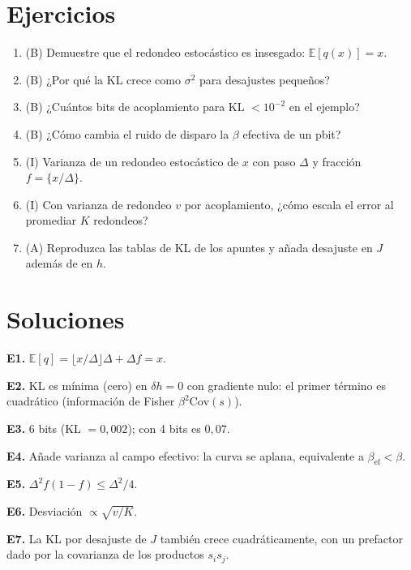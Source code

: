 \documentclass[11pt,a4paper]{article}
\begin{document}
\section{Ejercicios}
\begin{enumerate}[label=\textbf{E\arabic*.}]
\item (B) Demuestre que el redondeo estocástico es insesgado: $\mathbb E[q(x)]=x$.
\item (B) ¿Por qué la KL crece como $\sigma^2$ para desajustes pequeños?
\item (B) ¿Cuántos bits de acoplamiento para KL $<10^{-2}$ en el ejemplo?
\item (B) ¿Cómo cambia el ruido de disparo la $\beta$ efectiva de un pbit?
\item (I) Varianza de un redondeo estocástico de $x$ con paso $\Delta$ y fracción $f=\{x/\Delta\}$.
\item (I) Con varianza de redondeo $v$ por acoplamiento, ¿cómo escala el error al promediar $K$ redondeos?
\item (A) Reproduzca las tablas de KL de los apuntes y añada desajuste en $J$ además de en $h$.
\end{enumerate}
\section{Soluciones}
\begin{solucion}
\textbf{E1.} $\mathbb E[q]=\lfloor x/\Delta\rfloor\Delta+\Delta f=x$.

\textbf{E2.} KL es mínima (cero) en $\delta h=0$ con gradiente nulo: el primer término es cuadrático (información de Fisher $\beta^2\mathrm{Cov}(s)$).

\textbf{E3.} 6 bits (KL $=0{,}002$); con 4 bits es $0{,}07$.

\textbf{E4.} Añade varianza al campo efectivo: la curva se aplana, equivalente a $\beta_{\text{ef}}<\beta$.

\textbf{E5.} $\Delta^2f(1-f)\le\Delta^2/4$.

\textbf{E6.} Desviación $\propto\sqrt{v/K}$.

\textbf{E7.} La KL por desajuste de $J$ también crece cuadráticamente, con un prefactor dado por la covarianza de los productos $s_is_j$.
\end{solucion}
\end{document}
